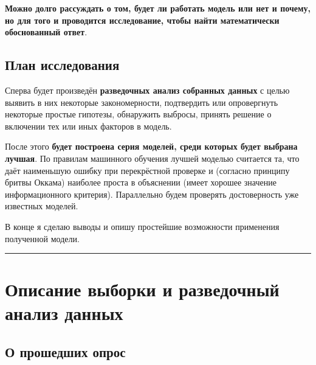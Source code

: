 \documentclass[
]{article}
\begin{document}
\textbf{Можно долго рассуждать о том, будет ли работать модель или нет и
почему, но для того и проводится исследование, чтобы найти математически
обоснованный ответ}.

\hypertarget{ux43fux43bux430ux43d-ux438ux441ux441ux43bux435ux434ux43eux432ux430ux43dux438ux44f}{%
\subsection{План
исследования}\label{ux43fux43bux430ux43d-ux438ux441ux441ux43bux435ux434ux43eux432ux430ux43dux438ux44f}}

Сперва будет произведён \textbf{разведочных анализ собранных данных} с
целью выявить в них некоторые закономерности, подтвердить или
опровергнуть некоторые простые гипотезы, обнаружить выбросы, принять
решение о включении тех или иных факторов в модель.

После этого \textbf{будет построена серия моделей, среди которых будет
выбрана лучшая}. По правилам машинного обучения лучшей моделью считается
та, что даёт наименьшую ошибку при перекрёстной проверке и (согласно
принципу бритвы Оккама) наиболее проста в объяснении (имеет хорошее
значение информационного критерия). Параллельно будем проверять
достоверность уже известных моделей.

В конце я сделаю выводы и опишу простейшие возможности применения
полученной модели.

\begin{center}\rule{0.5\linewidth}{0.5pt}\end{center}

\hypertarget{ux43eux43fux438ux441ux430ux43dux438ux435-ux432ux44bux431ux43eux440ux43aux438-ux438-ux440ux430ux437ux432ux435ux434ux43eux447ux43dux44bux439-ux430ux43dux430ux43bux438ux437-ux434ux430ux43dux43dux44bux445}{%
\section{Описание выборки и разведочный анализ
данных}\label{ux43eux43fux438ux441ux430ux43dux438ux435-ux432ux44bux431ux43eux440ux43aux438-ux438-ux440ux430ux437ux432ux435ux434ux43eux447ux43dux44bux439-ux430ux43dux430ux43bux438ux437-ux434ux430ux43dux43dux44bux445}}

\hypertarget{ux43e-ux43fux440ux43eux448ux435ux434ux448ux438ux445-ux43eux43fux440ux43eux441}{%
\subsection{О прошедших
опрос}\label{ux43e-ux43fux440ux43eux448ux435ux434ux448ux438ux445-ux43eux43fux440ux43eux441}}
\end{document}
